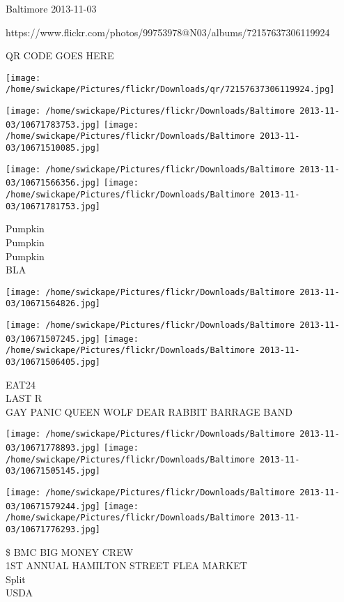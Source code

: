 \documentclass[10pt,letterpaper]{article}
\begin{document}
Baltimore 2013-11-03

https://www.flickr.com/photos/99753978@N03/albums/72157637306119924

QR CODE GOES HERE

\texttt{[image: /home/swickape/Pictures/flickr/Downloads/qr/72157637306119924.jpg]}
\pagebreak

\texttt{[image: /home/swickape/Pictures/flickr/Downloads/Baltimore 2013-11-03/10671783753.jpg]}
\texttt{[image: /home/swickape/Pictures/flickr/Downloads/Baltimore 2013-11-03/10671510085.jpg]}

\texttt{[image: /home/swickape/Pictures/flickr/Downloads/Baltimore 2013-11-03/10671566356.jpg]}
\texttt{[image: /home/swickape/Pictures/flickr/Downloads/Baltimore 2013-11-03/10671781753.jpg]}

Pumpkin\\
Pumpkin\\
Pumpkin\\
BLA\\
\pagebreak

\texttt{[image: /home/swickape/Pictures/flickr/Downloads/Baltimore 2013-11-03/10671564826.jpg]}

\vspace{0.25in}
\texttt{[image: /home/swickape/Pictures/flickr/Downloads/Baltimore 2013-11-03/10671507245.jpg]}
\texttt{[image: /home/swickape/Pictures/flickr/Downloads/Baltimore 2013-11-03/10671506405.jpg]}

EAT24\\
LAST R\\
GAY PANIC QUEEN WOLF DEAR RABBIT BARRAGE BAND\\
\pagebreak

\texttt{[image: /home/swickape/Pictures/flickr/Downloads/Baltimore 2013-11-03/10671778893.jpg]}
\texttt{[image: /home/swickape/Pictures/flickr/Downloads/Baltimore 2013-11-03/10671505145.jpg]}

\texttt{[image: /home/swickape/Pictures/flickr/Downloads/Baltimore 2013-11-03/10671579244.jpg]}
\texttt{[image: /home/swickape/Pictures/flickr/Downloads/Baltimore 2013-11-03/10671776293.jpg]}

\$ BMC BIG MONEY CREW\\
1ST ANNUAL HAMILTON STREET FLEA MARKET\\
Split\\
USDA\\
\pagebreak
\end{document}
